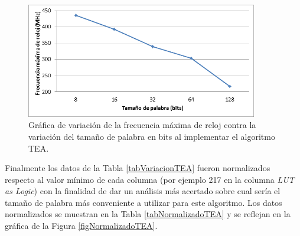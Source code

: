 \begin{figure}[H]
	\centering
	\includegraphics[width=0.9\textwidth]{./images/figFrecuenciasTEA}
	\caption{Gráfica de variación de la frecuencia máxima de reloj contra la variación del tamaño de palabra en bits al implementar el algoritmo TEA.}
	\label{figFrecuenciasTEA}
\end{figure}	
	
Finalmente los datos de la Tabla \ref{tabVariacionTEA} fueron normalizados respecto al valor mínimo de cada columna (por ejemplo 217 en la columna \textit{LUT as Logic}) con la finalidad de dar un análisis más acertado sobre cual sería el tamaño de palabra más conveniente a utilizar para este algoritmo. Los datos normalizados se muestran en la Tabla \ref{tabNormalizadoTEA} y se reflejan en la gráfica de la Figura \ref{figNormalizadoTEA}.

